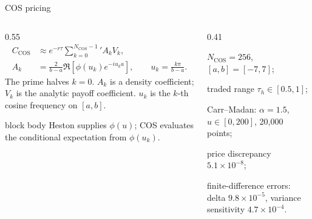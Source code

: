 \begin{frame}[t]{COS pricing}
  \vspace{0.04cm}
  \begin{columns}[T,onlytextwidth]
    \begin{column}{0.55\textwidth}
      {\fontsize{8.5}{9.8}\selectfont\[
        \begin{aligned}
        C_{\mathrm{COS}}&\approx e^{-r\tau}
        \sum_{k=0}^{N_{\mathrm{COS}}-1}{}' A_kV_k,\\
        A_k&=\frac{2}{b-a}\Re\!\left[\phi(u_k)e^{-iu_ka}\right],
        \qquad u_k=\frac{k\pi}{b-a}.
        \end{aligned}
      \]}
      {\scriptsize\color{Slate}The prime halves \(k=0\). \(A_k\) is a density coefficient; \(V_k\) is the analytic payoff coefficient. \(u_k\) is the \(k\)-th cosine frequency on \([a,b]\).}
      \vspace{0.08cm}
      \begin{beamercolorbox}[rounded=true,sep=0.09cm]{block body}
        {\scriptsize Heston supplies \(\phi(u)\); COS evaluates the conditional expectation from \(\phi(u_k)\).}
      \end{beamercolorbox}
    \end{column}
    \begin{column}{0.41\textwidth}
      {\small\begin{tightitemize}
        \item \(N_{\mathrm{COS}}=256\), \([a,b]=[-7,7]\);
        \item traded range \(\tau_h\in[0.5,1]\);
        \item Carr--Madan: \(\alpha=1.5\), \(u\in[0,200]\), 20,000 points;
        \item price discrepancy \(5.1\times10^{-8}\);
        \item finite-difference errors: delta \(9.8\times10^{-5}\), variance sensitivity \(4.7\times10^{-4}\).
      \end{tightitemize}}
    \end{column}
  \end{columns}
\end{frame}

